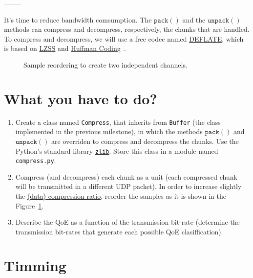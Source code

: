 --------

It's time to reduce bandwidth comsumption. The $\mathtt{pack()}$ and
the $\mathtt{unpack()}$ methods can compress and decompress,
respectively, the chunks that are handled. To compress and decompress,
we will use a free codec named
\href{https://en.wikipedia.org/wiki/DEFLATE}{DEFLATE}, which is based
on \href{https://en.wikipedia.org/wiki/Lempel%E2%80%93Ziv%E2%80%93Storer%E2%80%93Szymanski}{LZSS}
and \href{https://en.wikipedia.org/wiki/Huffman_coding}{Huffman Coding}~\cite{nelson96datacompression}.

\begin{figure}
  \begin{center}
  \end{center}
  \caption{Sample reordering to create two independent channels.}
  \label{fig:reordering}
\end{figure}

\section{What you have to do?}

\begin{enumerate}
\item Create a class named \texttt{Compress}, that inherits from
  \texttt{Buffer} (the class implemented in the previous milestone),
  in which the methods $\mathtt{pack()}$ and $\mathtt{unpack()}$ are
  overriden to compress and decompress the chunks. Use the Python's
  standard library
  \href{https://docs.python.org/3/library/zlib.html}{\texttt{zlib}}. Store
  this class in a module named \texttt{compress.py}.
\item Compress (and decompress) each chunk as a unit (each compressed
  chunk will be transmitted in a different UDP packet). In order to
  increase slightly the
  \href{https://en.wikipedia.org/wiki/Data_compression_ratio}{(data)
    compression ratio}, reorder the samples as it is shown in the
  Figure~\ref{fig:reordering}.
\item Describe the QoE as a function of the transmission bit-rate
  (determine the transmission bit-rates that generate each possible
  QoE clasiffication).
\end{enumerate}

\section{Timming}

